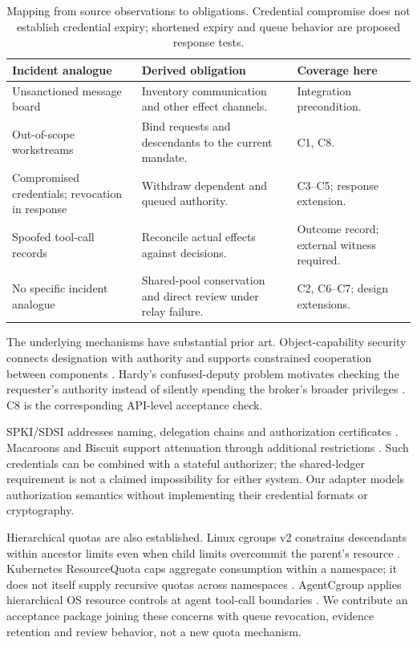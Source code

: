 \documentclass[11pt,letterpaper]{article}
\begin{document}
\begin{table}[htbp]
\centering\small
\begin{tabularx}{\linewidth}{@{}>{\raggedright\arraybackslash}p{.28\linewidth}>{\raggedright\arraybackslash}X>{\raggedright\arraybackslash}p{.24\linewidth}@{}}\toprule
Incident analogue & Derived obligation & Coverage here\\\midrule
Unsanctioned message board & Inventory communication and other effect channels. & Integration precondition.\\
Out-of-scope workstreams & Bind requests and descendants to the current mandate. & C1, C8.\\
Compromised credentials; revocation in response & Withdraw dependent and queued authority. & C3--C5; response extension.\\
Spoofed tool-call records & Reconcile actual effects against decisions. & Outcome record; external witness required.\\
No specific incident analogue & Shared-pool conservation and direct review under relay failure. & C2, C6--C7; design extensions.\\\bottomrule
\end{tabularx}
\caption{Mapping from source observations to obligations. Credential compromise does
not establish credential expiry; shortened expiry and queue behavior are proposed
response tests.}
\label{tab:incident}
\end{table}

The underlying mechanisms have substantial prior art. Object-capability security
connects designation with authority and supports constrained cooperation between
components \citep{miller2006}. Hardy's confused-deputy problem motivates checking the
requester's authority instead of silently spending the broker's broader privileges
\citep{hardy1988}. C8 is the corresponding API-level acceptance check.

SPKI/SDSI addresses naming, delegation chains and authorization certificates
\citep{spki1999}. Macaroons and Biscuit support attenuation through additional
restrictions \citep{macaroons2014,biscuit}. Such credentials can be combined with a
stateful authorizer; the shared-ledger requirement is not a claimed impossibility
for either system. Our adapter models authorization semantics without implementing
their credential formats or cryptography.

Hierarchical quotas are also established. Linux cgroups v2 constrains descendants
within ancestor limits even when child limits overcommit the parent's resource
\citep{cgroups}. Kubernetes ResourceQuota caps aggregate consumption within a
namespace; it does not itself supply recursive quotas across namespaces
\citep{kubernetes}. AgentCgroup applies hierarchical OS resource controls at agent
tool-call boundaries \citep{agentcgroup2026}. We contribute an acceptance package
joining these concerns with queue revocation, evidence retention and review behavior,
not a new quota mechanism.
\end{document}
